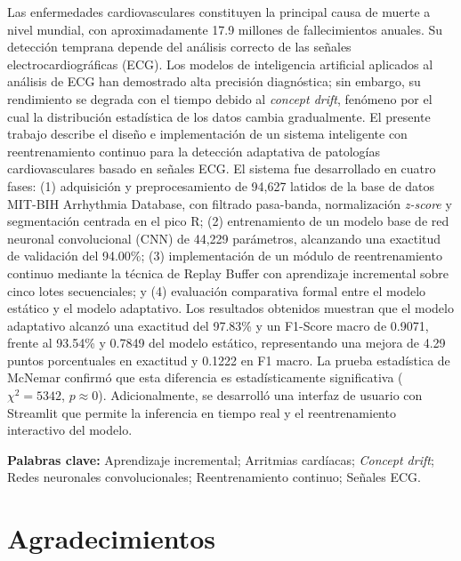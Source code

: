 \documentclass[11pt,spanish]{citedi}
\begin{document}
Las enfermedades cardiovasculares constituyen la principal causa de muerte a nivel mundial, con aproximadamente 17.9 millones de fallecimientos anuales. Su detección temprana depende del análisis correcto de las señales electrocardiográficas (ECG). Los modelos de inteligencia artificial aplicados al análisis de ECG han demostrado alta precisión diagnóstica; sin embargo, su rendimiento se degrada con el tiempo debido al \textit{concept drift}, fenómeno por el cual la distribución estadística de los datos cambia gradualmente. El presente trabajo describe el diseño e implementación de un sistema inteligente con reentrenamiento continuo para la detección adaptativa de patologías cardiovasculares basado en señales ECG. El sistema fue desarrollado en cuatro fases: (1) adquisición y preprocesamiento de 94,627 latidos de la base de datos MIT-BIH Arrhythmia Database, con filtrado pasa-banda, normalización \textit{z-score} y segmentación centrada en el pico R; (2) entrenamiento de un modelo base de red neuronal convolucional (CNN) de 44,229 parámetros, alcanzando una exactitud de validación del 94.00\%; (3) implementación de un módulo de reentrenamiento continuo mediante la técnica de Replay Buffer con aprendizaje incremental sobre cinco lotes secuenciales; y (4) evaluación comparativa formal entre el modelo estático y el modelo adaptativo. Los resultados obtenidos muestran que el modelo adaptativo alcanzó una exactitud del 97.83\% y un F1-Score macro de 0.9071, frente al 93.54\% y 0.7849 del modelo estático, representando una mejora de 4.29 puntos porcentuales en exactitud y 0.1222 en F1 macro. La prueba estadística de McNemar confirmó que esta diferencia es estadísticamente significativa ($\chi^2 = 5342$, $p \approx 0$). Adicionalmente, se desarrolló una interfaz de usuario con Streamlit que permite la inferencia en tiempo real y el reentrenamiento interactivo del modelo.

\bigskip
\noindent \textbf{Palabras clave:} Aprendizaje incremental; Arritmias cardíacas; \textit{Concept drift}; Redes neuronales convolucionales; Reentrenamiento continuo; Señales ECG.

\chapter*{Agradecimientos}

\bigskip
\end{document}
